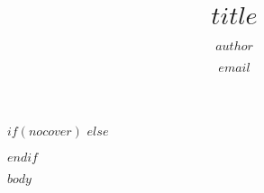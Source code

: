 \documentclass[$if(fontsize)$
  $fontsize$,
$endif$
$if(papersize)$
  $papersize$paper,
$endif$]{scrartcl}
\title{$title$}
\author{$author$}
\date{\texttt{$email$}}
\begin{document}
$if(nocover)$
$else$
\maketitle
\setcounter{page}{0}
\thispagestyle{empty}
\clearpage
$endif$

$body$
\end{document}

